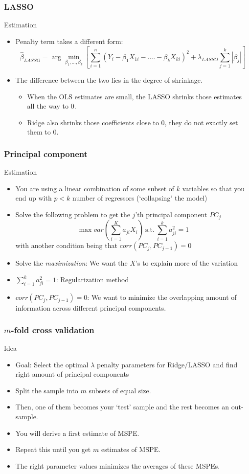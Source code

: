 \documentclass[compress]{beamer}
\begin{document}
\begin{frame}
\frametitle{LASSO}
Estimation
\begin{itemize}
\item Penalty term takes a different form: 
\[
\hat{\beta}_{LASSO}=\arg\min_{\beta_1,...,\beta_k}\left[ \sum_{i=1}^n(Y_i - \beta_1X_{1i}-....-\beta_kX_{ki})^2 + \lambda_{LASSO}\sum_{j=1}^k |\beta_j|\right]
\]
\item The difference between the two lies in the degree of shrinkage. 
\begin{itemize}
\item When the OLS estimates are small, the LASSO shrinks those estimates all the way to 0. 
\item Ridge also shrinks those coefficients close to 0, they do not exactly set them to 0. 
\end{itemize}
\end{itemize}
\end{frame}

\begin{frame}
\frametitle{Principal component}
Estimation
\begin{itemize}
\item You are using a linear combination of some subset of $k$ variables so that you end up with $p<k$ number of regressors (`collapsing' the model)
\item Solve the following problem to get the $j$'th principal component $PC_j$
\[
\max var\left(\sum_{i=1}^Ka_{ji}X_i\right)\  \text{s.t.}\ \sum_{i=1}^ka_{ji}^2=1
\]
with another condition being that $corr(PC_j,PC_{j-1})=0$
\item Solve the \textit{maximization}: We want the $X$'s to explain more of the variation
\item $\sum_{i=1}^ka_{ji}^2=1$: Regularization method
\item $corr(PC_j,PC_{j-1})=0$: We want to minimize the overlapping amount of information across different principal components.
\end{itemize}
\end{frame}

\begin{frame}
\frametitle{$m$-fold cross validation}
Idea
\begin{itemize}
\item Goal: Select the optimal $\lambda$ penalty parameters for Ridge/LASSO and find right amount of principal components
\item Split the sample into $m$ subsets of equal size. 
\item Then, one of them becomes your `test' sample and the rest becomes an out-sample. 
\item You will derive a first estimate of MSPE. 
\item Repeat this until you get $m$ estimates of MSPE. 
\item The right parameter values minimizes the averages of these MSPEs. 
\end{itemize}
\end{frame}
\end{document}
